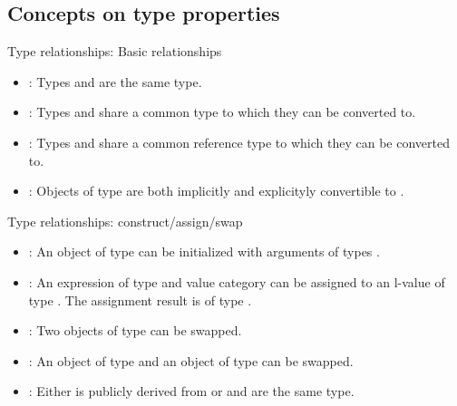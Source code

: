 \subsection{Concepts on type properties}

\begin{frame}[t,fragile]{Type relationships: Basic relationships}
\begin{itemize}
  \item {}: 
        Types  and  are the same type.

  \item {}:
        Types  and  share a common type
        to which they can be converted to.

  \item {}:
        Types  and  share a common reference type
        to which they can be converted to.

  \item {}: 
        Objects of type  are both implicitly and explicityly
        convertible to .
\end{itemize}
\end{frame}

\begin{frame}[t,fragile]{Type relationships: construct/assign/swap}
\begin{itemize}
  \item {}:
        An object of type  can be initialized with 
        arguments of types .

  \item {}:
        An expression of type and value category 
        can be assigned to an l-value of type .
        The assignment result is of type .

  \item {}:
        Two objects of type  can be swapped.

  \item {}:
        An object of type  and an object of type 
        can be swapped.

  \item {}:
        Either  is publicly derived from  or 
         and  are the same type.
\end{itemize}
\end{frame}

